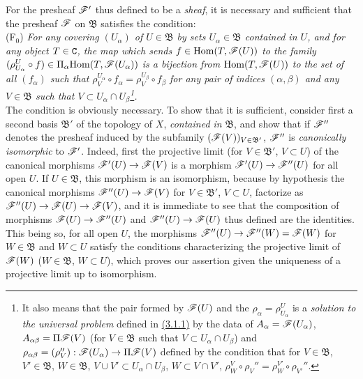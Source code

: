 \begin{env}[3.2.2]
\label{0.3.2.2}
For the presheaf $\mathscr{F}'$ thus defined to be a {\em sheaf}, it is necessary
and sufficient that the presheaf $\mathscr{F}$ on $\mathfrak{B}$ satisfies the
condition:\\

(F$_0$) {\em For any covering $(U_\alpha)$ of $U\in\mathfrak{B}$ by sets
        $U_\alpha\in\mathfrak{B}$ contained in $U$, and for any object $T\in\mathtt{C}$,
        the map which sends $f\in{\mathop{\mathrm{Hom}}\nolimits}(T,\mathscr{F}(U))$ to the family
        $(\rho_{U_\alpha}^U\circ f)\in\Pi_\alpha{\mathop{\mathrm{Hom}}\nolimits}(T,\mathscr{F}(U_\alpha))$ is a
        bijection from ${\mathop{\mathrm{Hom}}\nolimits}(T,\mathscr{F}(U))$ to the set of all $(f_\alpha)$ such
        that $\rho_V^{U_\alpha}\circ f_\alpha=\rho_V^{U_\beta}\circ f_\beta$ for
        any pair of indices $(\alpha,\beta)$ and any $V\in\mathfrak{B}$ such
        that $V\subset U_\alpha\cap U_\beta$\footnote{It also means that the
        pair formed by $\mathscr{F}(U)$ and the $\rho_\alpha=\rho_{U_\alpha}^U$ is a
        {\em solution to the universal problem} defined in \hyperref[0.3.1.1]{(3.1.1)} by
        the data of $A_\alpha=\mathscr{F}(U_\alpha)$, $A_{\alpha\beta}=\Pi\mathscr{F}(V)$
        (for $V\in\mathfrak{B}$ such that $V\subset U_\alpha\cap U_\beta$) and
        $\rho_{\alpha\beta}=(\rho_V''):\mathscr{F}(U_\alpha)\to\Pi\mathscr{F}(V)$ defined
        by the condition that for $V\in\mathfrak{B}$, $V'\in\mathfrak{B}$,
        $W\in\mathfrak{B}$, $V\cup V'\subset U_\alpha\cap U_\beta$,
        $W\subset V\cap V'$,
        $\rho_W^V\circ\rho_V''=\rho_W^{V'}\circ\rho_{V'}''$.}.}\\

The condition is obviously necessary. To show that it is sufficient, consider
first a second basis $\mathfrak{B}'$ of the topology of $X$, {\em contained in}
$\mathfrak{B}$, and show that if $\mathscr{F}''$ denotes the presheaf induced by the
subfamily $(\mathscr{F}(V))_{V\in\mathfrak{B}'}$, $\mathscr{F}''$ is {\em canonically
isomorphic} to $\mathscr{F}'$. Indeed, first the projective limit (for
$V\in\mathfrak{B}'$, $V\subset U$) of the canonical morphisms
$\mathscr{F}'(U)\to\mathscr{F}(V)$ is a morphism $\mathscr{F}'(U)\to\mathscr{F}''(U)$ for all open
$U$. If $U\in\mathfrak{B}$, this morphism is an isomorphism, because by
hypothesis the canonical morphisms $\mathscr{F}''(U)\to\mathscr{F}(V)$ for
$V\in\mathfrak{B}'$, $V\subset U$, factorize as
$\mathscr{F}''(U)\to\mathscr{F}(U)\to\mathscr{F}(V)$, and it is immediate to see that the
composition of morphisms $\mathscr{F}(U)\to\mathscr{F}''(U)$ and $\mathscr{F}''(U)\to\mathscr{F}(U)$
thus defined are the identities. This being so, for all open $U$, the morphisms
$\mathscr{F}''(U)\to\mathscr{F}''(W)=\mathscr{F}(W)$ for $W\in\mathfrak{B}$ and $W\subset U$
satisfy the conditions characterizing the projective limit of $\mathscr{F}(W)$
($W\in\mathfrak{B}$, $W\subset U$), which proves our assertion given the
uniqueness of a projective limit up to isomorphism.


\end{env}
